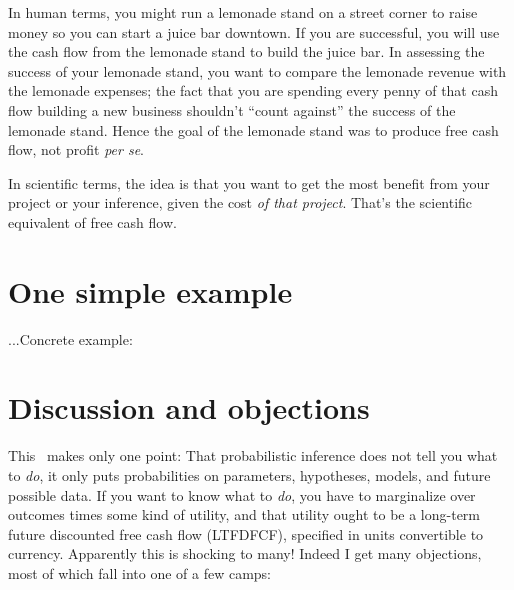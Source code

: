 \documentclass[12pt,twoside,pdftex]{article}
\begin{document}
In human terms, you might run a lemonade stand on a street corner to
raise money so you can start a juice bar downtown.  If you are
successful, you will use the cash flow from the lemonade stand to
build the juice bar.  In assessing the success of your lemonade stand,
you want to compare the lemonade revenue with the lemonade expenses;
the fact that you are spending every penny of that cash flow building
a new business shouldn't ``count against'' the success of the lemonade
stand.  Hence the goal of the lemonade stand was to produce free cash
flow, not profit \emph{per se}.

In scientific terms, the idea is that you want to get the most benefit
from your project or your inference, given the cost \emph{of that
  project}.  That's the scientific equivalent of free cash flow.

\section{One simple example}

...Concrete example: 

\section{Discussion and objections}

This \documentname\ makes only one point: That probabilistic inference
does not tell you what to \emph{do}, it only puts probabilities on
parameters, hypotheses, models, and future possible data.  If you want
to know what to \emph{do}, you have to marginalize over outcomes times
some kind of utility, and that utility ought to be a long-term future
discounted free cash flow (LTFDFCF), specified in units convertible to
currency.  Apparently this is shocking to many!  Indeed I get many
objections, most of which fall into one of a few camps:
\end{document}
